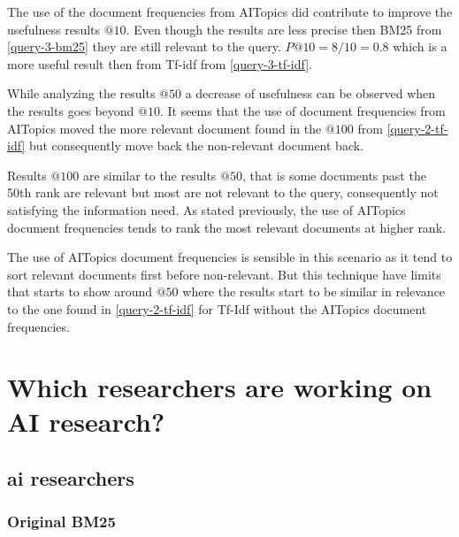 \par The use of the document frequencies from AITopics did contribute to improve the usefulness results $@10$. Even though the results are less precise then BM25 from \ref{query-3-bm25} they are still relevant to the query. $P@10=8/10=0.8$ which is a more useful result then from Tf-idf from \ref{query-3-tf-idf}.
\par While analyzing the results $@50$ a decrease of usefulness can be observed when the results goes beyond $@10$. It seems that the use of document frequencies from AITopics moved the more relevant document found in the $@100$ from \ref{query-2-tf-idf} but consequently move back the non-relevant document back.
\par Results $@100$ are similar to the results $@50$, that is some documents past the 50th rank are relevant but most are not relevant to the query, consequently not satisfying the information need. As stated previously, the use of AITopics document frequencies tends to rank the most relevant documents at higher rank.
\par The use of AITopics document frequencies is sensible in this scenario as it tend to sort relevant documents first before non-relevant. But this technique have limits that starts to show around $@50$ where the results start to be similar in relevance to the one found in \ref{query-2-tf-idf} for Tf-Idf without the AITopics document frequencies.

\section{Which researchers are working on AI research?}

\subsection{ai researchers}\label{query-4}

\subsubsection{Original BM25}\label{query-4-bm25}

